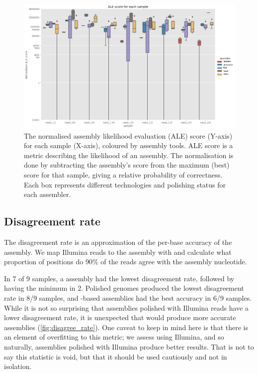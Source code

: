 \begin{figure}
\includegraphics[width=1.0\textwidth]{Appendix1/Figs/ale_score.png}
\centering
\caption{The normalised assembly likelihood evaluation (ALE) score (Y-axis) for each sample (X-axis), coloured by assembly tools. ALE score is a metric describing the likelihood of an assembly. The normalisation is done by subtracting the assembly's score from the maximum (best) score for that sample, giving a relative probability of correctness. Each box represents different technologies and polishing status for each assembler.}
\label{fig:ale_score}
\end{figure}

\subsection{Disagreement rate}
\label{app:asm_disagree}

The disagreement rate is an approximation of the per-base accuracy of the assembly. We map Illumina reads to the assembly with  and calculate what proportion of positions do 90\% of the reads agree with the assembly nucleotide.  

In 7 of 9 samples, a  assembly had the lowest disagreement rate, followed by  having the minimum in 2. Polished genomes produced the lowest disagreement rate in 8/9 samples, and \ont{}-based assemblies had the best accuracy in 6/9 samples. While it is not so surprising that assemblies polished with Illumina reads have a lower disagreement rate, it is unexpected that \ont{} would produce more accurate assemblies (\autoref{fig:disagree_rate}). One caveat to keep in mind here is that there is an element of overfitting to this metric; we assess using Illumina, and so naturally, assemblies polished with Illumina produce better results. That is not to say this statistic is void, but that it should be used cautiously and not in isolation.

